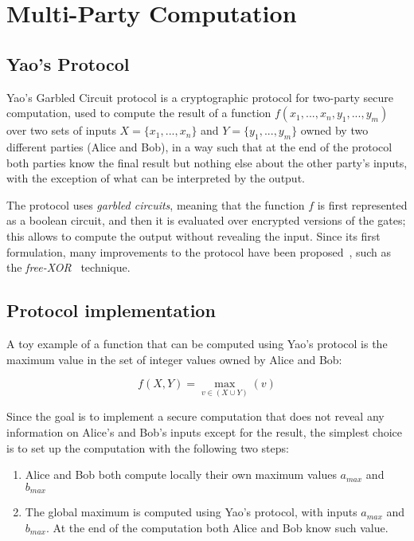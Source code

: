 \section{Multi-Party Computation}\label{sec:yao}

\subsection{Yao's Protocol}

Yao's Garbled Circuit protocol is a cryptographic protocol for two-party secure computation, used to compute the result of a function $f(x_1,...,x_n,y_1,...,y_m)$ over two sets of inputs $X=\{x_1,...,x_n\}$ and $Y=\{y_1,...,y_m\}$ owned by two different parties (Alice and Bob), in a way such that at the end of the protocol both parties know the final result but nothing else about the other party's inputs, with the exception of what can be interpreted by the output. 

The protocol uses \textit{garbled circuits}, meaning that the function $f$ is first represented as a boolean circuit, and then it is evaluated over encrypted versions of the gates; this allows to compute the output without revealing the input. Since its first formulation, many improvements to the protocol have been proposed~\cite{yaoefficiency, freeXOR, point-and-permute}, such as the \textit{free-XOR}~\cite{freeXOR} technique.

\subsection{Protocol implementation}

A toy example of a function that can be computed using Yao's protocol is the maximum value in the set of integer values owned by Alice and Bob:

$$
    f(X,Y) = \max_{v \in (X \cup Y)}(v)
$$

Since the goal is to implement a secure computation that does not reveal any information on Alice's and Bob's inputs except for the result, the simplest choice is to set up the computation with the following two steps:

\begin{enumerate}
    \item Alice and Bob both compute locally their own maximum values $a_{max}$ and $b_{max}$
    \item The global maximum is computed using Yao's protocol, with inputs $a_{max}$ and $b_{max}$. At the end of the computation both Alice and Bob know such value.
\end{enumerate}


